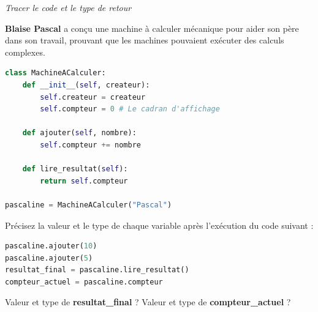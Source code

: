 \newpage
\begin{Exercise}[title=La Pascaline de Blaise Pascal (XVIIe Siècle)]
\begin{center}
    \textit{{Tracer le code et le type de retour}}
\end{center}

\textbf{Blaise Pascal} a conçu une machine à calculer mécanique pour aider son père dans son travail, prouvant que les machines pouvaient exécuter des calculs complexes.

\begin{lstlisting}[language=Python]
class MachineACalculer:
    def __init__(self, createur):
        self.createur = createur
        self.compteur = 0 # Le cadran d'affichage

    def ajouter(self, nombre):
        self.compteur += nombre

    def lire_resultat(self):
        return self.compteur

pascaline = MachineACalculer("Pascal")
\end{lstlisting}

Précisez la valeur et le type de chaque variable après l'exécution du code suivant :

\begin{lstlisting}[language=Python]
pascaline.ajouter(10)
pascaline.ajouter(5)
resultat_final = pascaline.lire_resultat()
compteur_actuel = pascaline.compteur
\end{lstlisting}

\Question Valeur et type de \textbf{resultat\_final} ?
\Question Valeur et type de \textbf{compteur\_actuel} ?
\end{Exercise}


